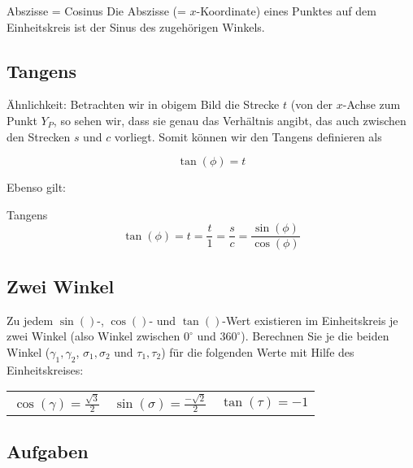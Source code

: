 \begin{bemerkung}{Abszisse = Cosinus}{}
  Die Abszisse (= $x$-Koordinate) eines Punktes auf dem Einheitskreis ist
  der Sinus des zugehörigen Winkels.
\end{bemerkung}

\newpage
\subsection{Tangens}

\einheitskreis{}
Ähnlichkeit: 
Betrachten wir in obigem Bild die Strecke $t$ (von der $x$-Achse zum
Punkt $Y_P$, so sehen wir, dass sie genau das Verhältnis angibt, das
auch zwischen den Strecken $s$ und $c$ vorliegt. 
Somit können wir den Tangens definieren als

$$\tan(\phi) = t$$

Ebenso gilt:
\begin{gesetz}{Tangens}{}
$$\tan(\phi) = t = \frac{t}{1} =  \frac{s}{c} = \frac{\sin(\phi)}{\cos(\phi)}$$
\end{gesetz}


\subsection{Zwei Winkel}
Zu jedem $\sin()$-, $\cos()$- und $\tan()$-Wert existieren im
Einheitskreis je zwei Winkel (also Winkel zwischen $0^{\circ{}}$ und
$360^{\circ{}}$). Berechnen Sie je die beiden Winkel ($\gamma_1, \gamma_2$,
$\sigma_1, \sigma_2$ und $\tau_1, \tau_2$) für die folgenden Werte mit Hilfe des
Einheitskreises:


\begin{tabular}{|c|c|c|}
  $\cos(\gamma)=\frac{\sqrt{3}}{2}$ & $\sin(\sigma) = \frac{-\sqrt{2}}{2}$ & $\tan(\tau) = -1$\\
\end{tabular}

\newpage



\subsection*{Aufgaben}


\newpage


